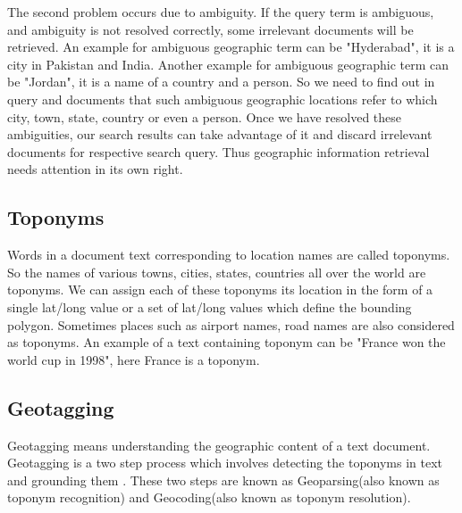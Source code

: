 \documentclass[
     11pt,         %
     a4paper,      %
     oneside,
     ]{article}
\begin{document}
The second problem occurs due to ambiguity. If the query term is ambiguous, and ambiguity is not resolved correctly, some irrelevant documents will be retrieved. An example for ambiguous geographic term can be "Hyderabad", it is a city in Pakistan and India. Another example for ambiguous geographic term can be "Jordan", it is a name of a country and a person. So we need to find out in query and documents that such ambiguous geographic locations refer to which city, town, state, country or even a person. Once we have resolved these ambiguities, our search results can take advantage of it and discard irrelevant documents for respective search query. Thus geographic information retrieval needs attention in its own right.  

\subsection{Toponyms} Words in a document text corresponding to location names are called toponyms. So the names of various towns, cities, states, countries all over the world are toponyms. We can assign each of these toponyms its location in the form of a single lat/long value or a set of lat/long values which define the bounding polygon. Sometimes places such as airport names, road names are also considered as toponyms. An example of a text containing toponym can be "France won the world cup in 1998", here France is a toponym. 
\subsection{Geotagging} Geotagging means understanding the geographic content of a text document. Geotagging is a two step process which involves detecting the toponyms in text and grounding them \cite{Lieberman12adaptivecontext}. These two steps are known as Geoparsing(also known as toponym recognition) and Geocoding(also known as toponym resolution). 
\end{document}
